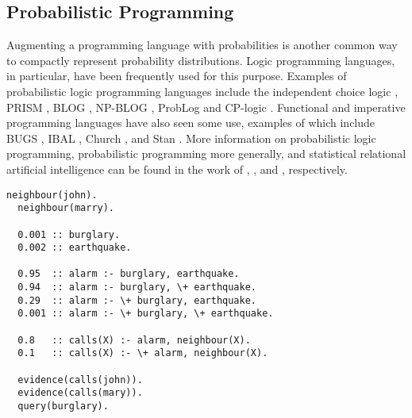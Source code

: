 \subsection{Probabilistic Programming}\label{sec:probprogramming}

Augmenting a programming language with probabilities is another common way to
compactly represent probability distributions. Logic programming languages, in
particular, have been frequently used for this purpose. Examples of
probabilistic logic programming languages include the independent choice logic
\citep{DBLP:journals/ai/Poole97,DBLP:conf/ilp/Poole08}, PRISM
\citep{DBLP:conf/ijcai/SatoK97,DBLP:conf/ilp/SatoK08}, BLOG
\citep{DBLP:conf/ijcai/MilchMRSOK05}, NP-BLOG
\citep{DBLP:conf/uai/CarbonettoKFP05}, ProbLog \citep{DBLP:conf/ijcai/RaedtKT07}
and CP-logic \citep{DBLP:journals/tplp/VennekensDB09}. Functional and imperative
programming languages have also seen some use, examples of which include BUGS
\citep{gilks1994language}, IBAL \citep{DBLP:conf/ijcai/Pfeffer01}, Church
\citep{DBLP:conf/uai/GoodmanMRBT08}, and Stan \citep{stan}. More information on
probabilistic logic programming, probabilistic programming more generally, and
statistical relational artificial intelligence can be found in the work of
\citet{DBLP:conf/ilp/2008p}, \citet{DBLP:conf/icse/GordonHNR14}, and
\citet{DBLP:series/synthesis/2016Raedt}, respectively.

\begin{lstlisting}[caption=A ProbLog program that computes
  $\protect{\Pr(B \mid J, M)}$ for the scenario described in \cref{example:bn}.,
  label={lst:problog}]
  neighbour(john).
  neighbour(marry).

  0.001 :: burglary.
  0.002 :: earthquake.

  0.95  :: alarm :- burglary, earthquake.
  0.94  :: alarm :- burglary, \+ earthquake.
  0.29  :: alarm :- \+ burglary, earthquake.
  0.001 :: alarm :- \+ burglary, \+ earthquake.

  0.8   :: calls(X) :- alarm, neighbour(X).
  0.1   :: calls(X) :- \+ alarm, neighbour(X).

  evidence(calls(john)).
  evidence(calls(mary)).
  query(burglary).
\end{lstlisting}

